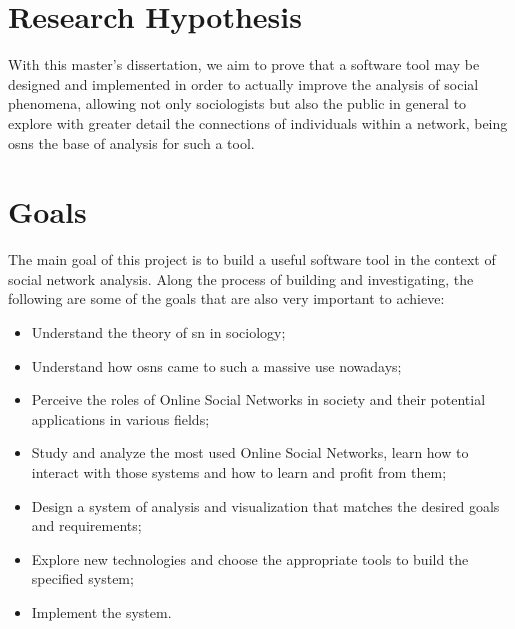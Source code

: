 
\section{Research Hypothesis}
With this master's dissertation, we aim to prove that a software tool may be designed and implemented in order to actually improve the analysis of social phenomena, allowing not only sociologists but also the public in general to explore with greater
detail the connections of individuals within a network, being \glspl{osn} the base of analysis for such a tool.

\section{Goals}

The main goal of this project is to build a useful software tool in the context of social network analysis. Along the process of building and investigating, the following are some of the goals that are also very important to achieve:

\begin{itemize}
\item Understand the theory of \gls{sn} in sociology;
\item Understand how \glspl{osn} came to such a massive use nowadays;
\item Perceive the roles of Online Social Networks in society and their potential applications in various fields;
\item Study and analyze the most used Online Social Networks, learn how to interact with those systems and how to learn and profit from them;
\item Design a system of analysis and visualization that matches the desired goals and requirements;
\item Explore new technologies and choose the appropriate tools to build the specified system;
\item Implement the system.
\end{itemize}

